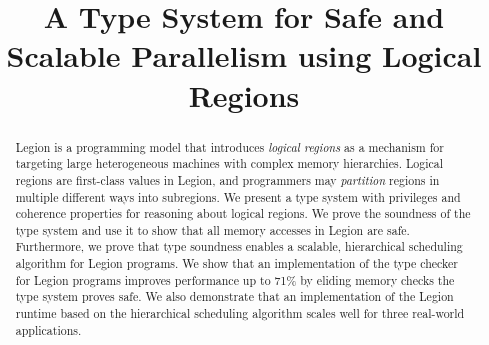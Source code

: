 \documentclass[9pt,nocopyrightspace]{sigplanconf}
\begin{document}
\title{A Type System for Safe and Scalable Parallelism using Logical Regions}
\maketitle

\begin{abstract}

Legion is a programming model that introduces
{\em logical regions} as a mechanism for targeting large heterogeneous machines 
with complex memory hierarchies.  Logical regions are first-class 
values in Legion, and programmers may {\em partition} regions in multiple different
ways into subregions.  We present
a type system with privileges and coherence properties for reasoning about logical regions.  
We prove the soundness of the type system and use it to show
that all memory accesses in Legion are safe.  Furthermore, we prove that
type soundness enables a scalable, hierarchical
scheduling algorithm for Legion programs.  We show that an implementation of the type checker
for Legion programs improves performance up to 71\% by eliding
memory checks the type system proves safe.  We also demonstrate that an implementation of the Legion 
runtime based on the hierarchical scheduling algorithm scales well for
three real-world applications.



\end{abstract}




%









{
\small

}
\end{document}

